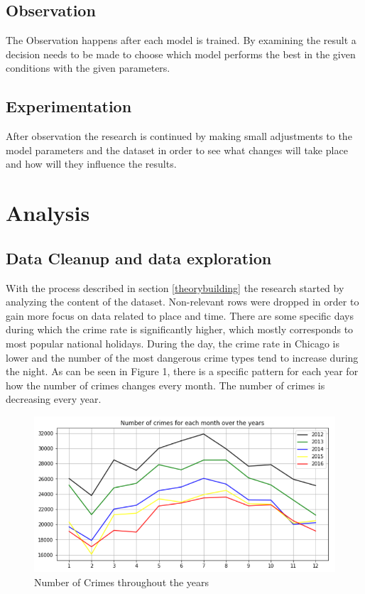 \documentclass[a4paper, twocolumn]{article}
\begin{document}
\subsection{Observation}
\label{observation}
    The Observation happens after each model is trained. By examining the result a decision needs to be made
    to choose  which model performs the best in the given conditions with the given parameters.
\subsection{Experimentation}
\label{experimentation}
    After observation the research is continued by making small adjustments to the model parameters and the dataset
    in order to see what changes will take place and how will they influence the results.

\section{Analysis}
\subsection{Data Cleanup and data exploration}
With the process described in section \ref{theorybuilding} the research started by analyzing the content of the dataset. 
Non-relevant rows were dropped in order to gain more focus on data related to place and time. 
There are some specific days during which the crime rate is significantly higher, which mostly corresponds to most popular national holidays. 
During the day, the crime rate in Chicago is lower and the number of the most dangerous crime types tend to increase during the night. 
As can be seen in Figure 1, there is a specific pattern for each year for how the number of crimes changes every month. 
The number of crimes is decreasing every year. 
\begin{figure}
    \includegraphics[scale=0.3]{fig1.png}

    \caption{Number of Crimes throughout the years}
\end{figure}
\end{document}
